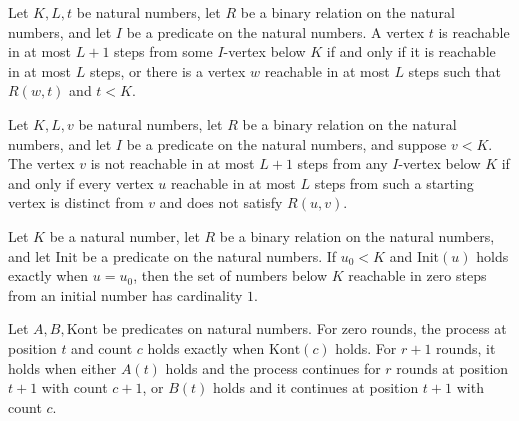 \begin{lemma}
\label{Complexity.LogProg.ISCount.mem_succ_iff}
\leanok
{}
Let $K,L,t$ be natural numbers, let $R$ be a binary relation on the natural numbers, and
let $I$ be a predicate on the natural numbers. A vertex $t$ is reachable in at most
$L+1$ steps from some $I$-vertex below $K$ if and only if it is reachable in at most $L$
steps, or there is a vertex $w$ reachable in at most $L$ steps such that $R(w,t)$ and
$t<K$.
\end{lemma}

\begin{lemma}
\label{Complexity.LogProg.ISCount.not_mem_succ_iff}
\leanok
{}
Let $K,L,v$ be natural numbers, let $R$ be a binary relation on the natural numbers, and
let $I$ be a predicate on the natural numbers, and suppose $v<K$. The vertex $v$ is not
reachable in at most $L+1$ steps from any $I$-vertex below $K$ if and only if every
vertex $u$ reachable in at most $L$ steps from such a starting vertex is distinct from
$v$ and does not satisfy $R(u,v)$.
\end{lemma}

\begin{lemma}
\label{Complexity.LogProg.ISCount.card_ball_zero}
\leanok
{}
Let $K$ be a natural number, let $R$ be a binary relation on the natural numbers, and
let $\text{Init}$ be a predicate on the natural numbers. If $u_0<K$ and $\text{Init}(u)$
holds exactly when $u=u_0$, then the set of numbers below $K$ reachable in zero steps
from an initial number has cardinality $1$.
\end{lemma}

\begin{definition}
\label{Complexity.LogProg.ISCount.GS}
\leanok
Let $A,B,\mathrm{Kont}$ be predicates on natural numbers. For zero rounds, the process
at position $t$ and count $c$ holds exactly when $\mathrm{Kont}(c)$ holds. For $r+1$
rounds, it holds when either $A(t)$ holds and the process continues for $r$ rounds at
position $t+1$ with count $c+1$, or $B(t)$ holds and it continues at position $t+1$ with
count $c$.
\end{definition}

